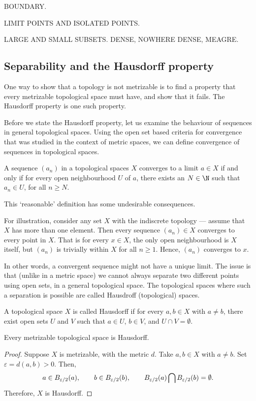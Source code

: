 BOUNDARY.

LIMIT POINTS AND ISOLATED POINTS.

LARGE AND SMALL SUBSETS. DENSE, NOWHERE DENSE, MEAGRE.

\subsection{Separability and the Hausdorff property}
One way to show that a topology is not metrizable is to find a property that every metrizable topological space must have, and show that it fails. The Hausdorff property is one such property.

Before we state the Hausdorff property, let us examine the behaviour of sequences in general topological spaces. Using the open set based criteria for convergence that was studied in the context of metric spaces, we can define convergence of sequences in topological spaces.
\begin{ndfn}
  A sequence $(a_n)$ in a topological spaces $X$ converges to a limit $a \in X$ if and only if for every open neighbourhood $U$ of $a$, there exists an $N \in \N$ such that $a_n \in U$, for all $n \geq N$.
\end{ndfn}
This `reasonable' definition has some undesirable consequences.

For illustration, consider any set $X$ with the indiscrete topology --- assume that $X$ has more than one element. Then every sequence $(a_n) \in X$ converges to every point in $X$. That is for every $x \in X$, the only open neighbourhood is $X$ itself, but $(a_n)$ is trivially within $X$ for all $n \geq 1$. Hence, $(a_n)$ converges to $x$.

In other words, a convergent sequence might not have a unique limit. The issue is that (unlike in a metric space) we cannot always separate two different points using open sets, in a general topological space. The topological spaces where such a separation is possible are called Hausdroff (topological) spaces.
\begin{ndfn}
  A topological space $X$ is called Hausdorff if for every $a, b \in X$ with $a \neq b$, there exist open sets $U$ and $V$ such that $a \in U$, $b \in V$, and $U \cap V = \emptyset$.
\end{ndfn}

\begin{nlemma}
  Every metrizable topological space is Hausdorff.
\end{nlemma}
\begin{proof}
  Suppose $X$ is metrizable, with the metric $d$. Take $a, b \in X$ with $a \neq b$. Set $\varepsilon = d(a,b) > 0$. Then,
  \begin{equation*}
    a \in B_{\varepsilon/2}(a),
    \qquad
    b \in B_{\varepsilon/2}(b),
    \qquad
    B_{\varepsilon/2}(a) \bigcap B_{\varepsilon/2}(b) = \emptyset.
  \end{equation*}
  Therefore, $X$ is Hausdorff.
\end{proof}

